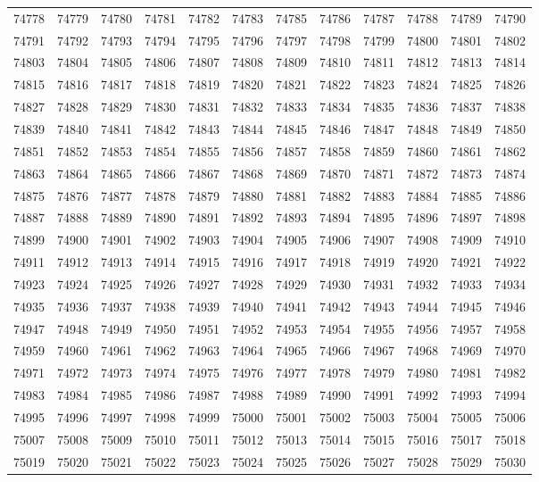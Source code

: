\begin{center}
\begin{longtable}{llllllllllll}
74778 &74779 &74780 &74781 &74782 &74783 &74785 &74786 &74787 &74788 &74789 &74790 \\
74791 &74792 &74793 &74794 &74795 &74796 &74797 &74798 &74799 &74800 &74801 &74802 \\
74803 &74804 &74805 &74806 &74807 &74808 &74809 &74810 &74811 &74812 &74813 &74814 \\
74815 &74816 &74817 &74818 &74819 &74820 &74821 &74822 &74823 &74824 &74825 &74826 \\
74827 &74828 &74829 &74830 &74831 &74832 &74833 &74834 &74835 &74836 &74837 &74838 \\
74839 &74840 &74841 &74842 &74843 &74844 &74845 &74846 &74847 &74848 &74849 &74850 \\
74851 &74852 &74853 &74854 &74855 &74856 &74857 &74858 &74859 &74860 &74861 &74862 \\
74863 &74864 &74865 &74866 &74867 &74868 &74869 &74870 &74871 &74872 &74873 &74874 \\
74875 &74876 &74877 &74878 &74879 &74880 &74881 &74882 &74883 &74884 &74885 &74886 \\
74887 &74888 &74889 &74890 &74891 &74892 &74893 &74894 &74895 &74896 &74897 &74898 \\
74899 &74900 &74901 &74902 &74903 &74904 &74905 &74906 &74907 &74908 &74909 &74910 \\
74911 &74912 &74913 &74914 &74915 &74916 &74917 &74918 &74919 &74920 &74921 &74922 \\
74923 &74924 &74925 &74926 &74927 &74928 &74929 &74930 &74931 &74932 &74933 &74934 \\
74935 &74936 &74937 &74938 &74939 &74940 &74941 &74942 &74943 &74944 &74945 &74946 \\
74947 &74948 &74949 &74950 &74951 &74952 &74953 &74954 &74955 &74956 &74957 &74958 \\
74959 &74960 &74961 &74962 &74963 &74964 &74965 &74966 &74967 &74968 &74969 &74970 \\
74971 &74972 &74973 &74974 &74975 &74976 &74977 &74978 &74979 &74980 &74981 &74982 \\
74983 &74984 &74985 &74986 &74987 &74988 &74989 &74990 &74991 &74992 &74993 &74994 \\
74995 &74996 &74997 &74998 &74999 &75000 &75001 &75002 &75003 &75004 &75005 &75006 \\
75007 &75008 &75009 &75010 &75011 &75012 &75013 &75014 &75015 &75016 &75017 &75018 \\
75019 &75020 &75021 &75022 &75023 &75024 &75025 &75026 &75027 &75028 &75029 &75030 \\

\end{longtable}
\end{center}
